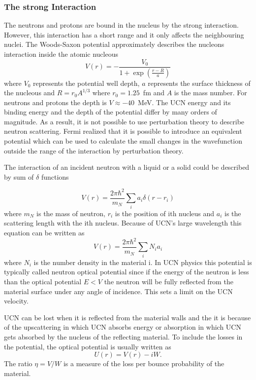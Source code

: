 \subsubsection{The strong Interaction}
The neutrons and protons are bound in the nucleus by the strong
interaction. However, this interaction has a short range and it only
affects the neighbouring nuclei.
The Woods-Saxon potential approximately
describes the nucleons interaction inside the atomic nucleous
\begin{equation}
  \label{eqn:woodsax}
  V(r) = - \frac{V_0}{1+\exp(\frac{r-R}{a})}
\end{equation}
where $V_0$ represents the potential well depth, $a$ represents the
surface thickness of the nucleous and $R = r_0 A^{1/3}$ where
$r_0 = 1.25$~fm and $A$ is the mass number. For neutrons and protons
the depth is $V \approx -40$~MeV. The UCN energy and its binding
energy and the depth of the potential differ by many orders of
magnitude. As a result, it is not possible to use perturbation theory
to describe neutron scattering. Fermi realized that it is possible to
introduce an equivalent potential which can be used to calculate the
small changes in the wavefunction outside the range of the interaction
by perturbation theory.

The interaction of an incident neutron with a liquid or a solid could
be described by sum of $\delta$ functions

\begin{equation}
  \label{eqn:vFermi}
  V(r) = \frac{2\pi \hbar^2}{m_N} \sum_i a_i \delta (r - r_i)
\end{equation}
where $m_N$ is the mass of neutron, $r_i$ is the position of ith
nucleus and $a_i$ is the scattering length with the ith
nucleus. Because of UCN's large wavelength this equation can be
written as
\begin{equation}
V(r) = \frac{2\pi \hbar^2}{m_N}\sum_i N_ia_i
\end{equation}
where $N_i$ is the number density in the material i. In UCN physics
this potential is typically called neutron optical potential since if
the energy of the neutron is less than the optical potential $E < V$
the neutron will be fully reflected from the material surface under
any angle of incidence. This sets a limit on the UCN velocity.

UCN can be lost when it is reflected from the material walls and the
it is because of the upscattering in which UCN absorbs energy or
absorption in which UCN gets absorbed by the nucleus of the reflecting
material. To include the losses in the potential, the optical
potential is usually written as
\begin{equation}
  U(r) = V(r) - iW.
\end{equation}
The ratio $\eta = V/W$ is a measure of the loss per bounce probability
of the material. 


